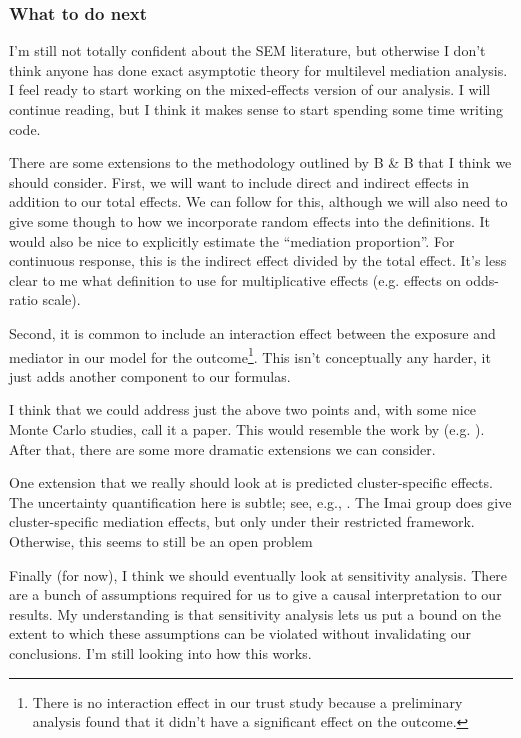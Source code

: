 \documentclass{article}
\begin{document}
\subsubsection{What to do next}

I'm still not totally confident about the SEM literature, but otherwise I don't think anyone has done exact asymptotic theory for multilevel mediation analysis. I feel ready to start working on the mixed-effects version of our analysis. I will continue reading, but I think it makes sense to start spending some time writing code.

There are some extensions to the methodology outlined by B \& B that I think we should consider. First, we will want to include direct and indirect effects in addition to our total effects. We can follow \citet{Sam23} for this, although we will also need to give some though to how we incorporate random effects into the definitions. It would also be nice to explicitly estimate the ``mediation proportion''. For continuous response, this is the indirect effect divided by the total effect. It's less clear to me what definition to use for multiplicative effects (e.g. effects on odds-ratio scale).

Second, it is common to include an interaction effect between the exposure and mediator in our model for the outcome\footnote{There is no interaction effect in our trust study because a preliminary analysis found that it didn't have a significant effect on the outcome.}. This isn't conceptually any harder, it just adds another component to our formulas. 

I think that we could address just the above two points and, with some nice Monte Carlo studies, call it a paper. This would resemble the work by \citeauthor{Sam23} (e.g. \citealp{Sam23}). After that, there are some more dramatic extensions we can consider.

One extension that we really should look at is predicted cluster-specific effects. The uncertainty quantification here is subtle; see, e.g., \citet{Skr09,Boo98}. The Imai group does give cluster-specific mediation effects, but only under their restricted framework. Otherwise, this seems to still be an open problem

Finally (for now), I think we should eventually look at sensitivity analysis. There are a bunch of assumptions required for us to give a causal interpretation to our results. My understanding is that sensitivity analysis lets us put a bound on the extent to which these assumptions can be violated without invalidating our conclusions. I'm still looking into how this works.
\end{document}
